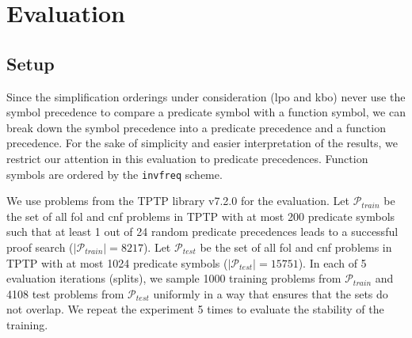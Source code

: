 
\section{Evaluation}
\label{sec:evaluation}

\subsection{Setup}

Since the simplification orderings under consideration (\acrshort*{lpo} and \acrshort*{kbo})
never use the symbol precedence to compare a predicate symbol with a function symbol,
we can break down the symbol precedence  into a predicate precedence and a function precedence.
For the sake of simplicity and easier interpretation of the results,
we restrict our attention in this evaluation to predicate precedences.
Function symbols are ordered by the \texttt{invfreq} scheme.

%	
%	
%	
%	

\newcommand{\ProblemsTrain}{\mathcal{P}_{\mathit{train}}}
\newcommand{\ProblemsTest}{\mathcal{P}_{\mathit{test}}}

We use problems from the TPTP library v7.2.0 \cite{Sut17} for the evaluation.
Let \(\ProblemsTrain\) be the set of all \acrshort*{fol} and \acrshort*{cnf} problems in TPTP
with at most 200 predicate symbols such that at least 1 out of 24 random predicate precedences
leads to a successful proof search (\(|\ProblemsTrain| = 8217\)).
Let \(\ProblemsTest\) be the set of all \acrshort*{fol} and \acrshort*{cnf} problems in TPTP
with at most 1024 predicate symbols (\(|\ProblemsTest| = 15751\)).
In each of 5 evaluation iterations (splits),
we sample 1000 training problems from \(\ProblemsTrain\)
and 4108 test problems from \(\ProblemsTest\)
uniformly in a way that ensures that the sets do not overlap.
We repeat the experiment 5 times to evaluate the stability of the training.

